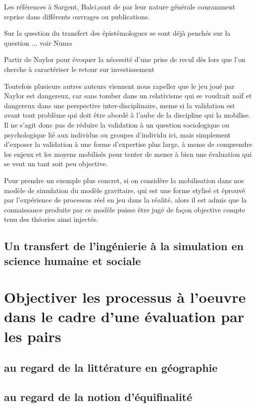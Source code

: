 {Les références à Sargent, Balci,sont de par leur nature générale couramment reprise dans différents ouvrages ou publications.

Sur la question du transfert des épistémologues se sont déjà penchés sur la question ... voir Numo

Partir de Naylor pour évoquer la nécessité d'une prise de recul dès lors que l'on cherche à caractériser le retour sur investissement

Toutefois plusieurs autres auteurs viennent nous rapeller que le jeu joué par Naylor est dangereux, car sans tomber dans un relativisme qui se voudrait naïf et dangereux dans une perspective inter-disciplinaire, meme si la validation est avant tout problème qui doit être abordé à l'aube de la discipline qui la mobilise. Il ne s'agit donc pas de réduire la validation à un question sociologique ou psychologique lié aux individus ou groupes d'individu ici, mais simplement d'exposer la validation à une forme d'expertise plus large, à meme de comprendre les enjeux et les moyens mobilisés pour tenter de mener à bien une évaluation qui se veut un tant soit peu objective.

Pour prendre un exemple plus concret, si on considère la mobilisation dans nos modèle de simulation du  modèle gravitaire, qui est une forme stylisé et éprouvé par l'expérience de processus réel en jeu dans la réalité, alors il est admis que la connaissance produite par ce modèle puisse être jugé de façon objective compte tenu des théories ainsi injectés.

\subsection{Un transfert de l'ingénierie à la simulation en science humaine et sociale}

\section{Objectiver les processus à l'oeuvre dans le cadre d'une évaluation par les pairs}

\subsection{au regard de la littérature en géographie}

\subsection{au regard de la notion d'équifinalité}

}

